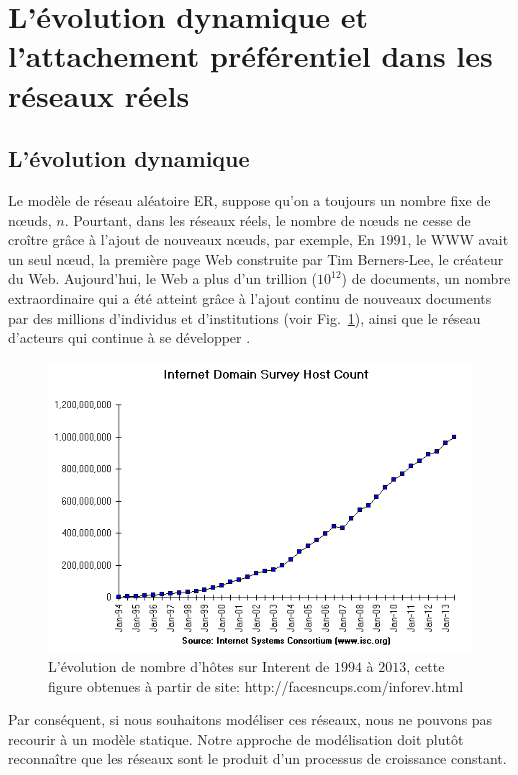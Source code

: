 \begin{sloppypar}
	\section{L'évolution dynamique et l'attachement préférentiel dans les réseaux réels}
\end{sloppypar}

\subsection{L'évolution dynamique}
Le modèle de réseau aléatoire ER, suppose qu'on a toujours un nombre fixe de nœuds, $n$. Pourtant, dans les réseaux réels, le nombre de nœuds ne cesse de croître grâce à l'ajout de nouveaux nœuds, par exemple, En $1991$, le WWW avait un seul nœud, la première page Web construite par Tim Berners-Lee, le créateur du Web. Aujourd'hui, le Web a plus d'un trillion ($10^{12}$) de documents, un nombre extraordinaire qui a été atteint grâce à l'ajout continu de nouveaux documents par des millions d'individus et d'institutions (voir Fig.~\ref{hosts}), ainsi que le réseau d'acteurs qui continue à se développer \cite{Barabasi2015}.
\begin{figure}[h]
	\centering
	\includegraphics[scale=0.5]{./figures/hosts}
	\caption{L'évolution de nombre d'hôtes sur Interent de $1994$ à $2013$, cette figure  obtenues à partir de site: http://facesncups.com/inforev.html}
	\label{hosts}
\end{figure}
Par conséquent, si nous souhaitons modéliser ces réseaux, nous ne pouvons pas recourir à un modèle statique. Notre approche de modélisation doit plutôt reconnaître que les réseaux sont le produit d'un processus de croissance constant.
